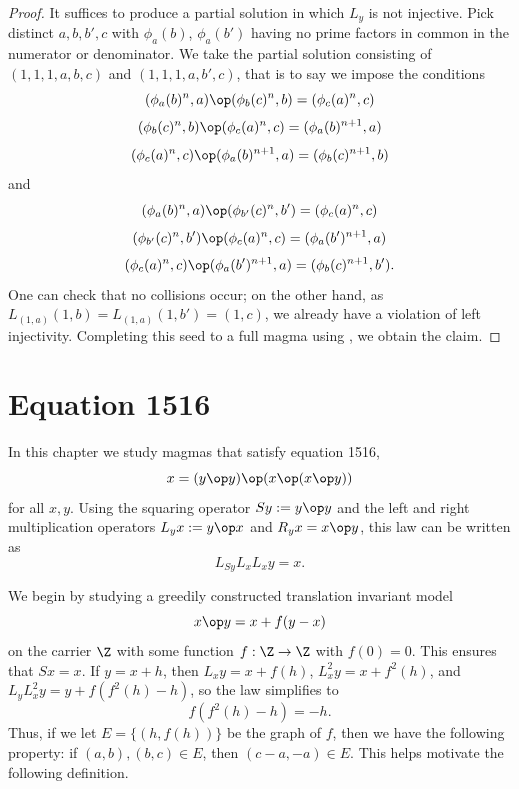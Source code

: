 \begin{proof} It suffices to produce a partial solution in which $L_y$ is not injective. Pick distinct $a, b, b', c$ with $\phi_a(b)$, $\phi_a(b')$ having no prime factors in common in the numerator or denominator.  We take the partial solution consisting of $(1,1,1,a,b,c)$ and $(1,1,1,a,b',c)$, that is to say we impose the conditions
$$ (\phi_a(b)^n,a) \op (\phi_b(c)^n,b) = (\phi_c(a)^n,c)$$
$$ (\phi_b(c)^n,b) \op (\phi_c(a)^n,c) = (\phi_a(b)^{n+1}, a)$$
$$ (\phi_c(a)^n,c) \op (\phi_a(b)^{n+1}, a) = (\phi_b(c)^{n+1},b)$$
and
$$ (\phi_a(b)^n,a) \op (\phi_{b'}(c)^n,b') = (\phi_c(a)^n,c)$$
$$ (\phi_{b'}(c)^n,b') \op (\phi_c(a)^n,c) = (\phi_a(b')^{n+1}, a)$$
$$ (\phi_c(a)^n,c) \op (\phi_{a}(b')^{n+1}, a) = (\phi_b(c)^{n+1},b').$$
One can check that no collisions occur; on the other hand, as $L_{(1,a)} (1,b) = L_{(1,a)} (1,b') = (1,c)$, we already have a violation of left injectivity.  Completing this seed to a full magma using , we obtain the claim.
\end{proof}


\chapter{Equation 1516}\label{1516-chapter}

In this chapter we study magmas that satisfy equation 1516,
\begin{equation}\label{1516}
  x = (y \op y) \op (x \op (x \op y))
\end{equation}
for all $x,y$.  Using the squaring operator $Sy := y \op y$ and the left and right multiplication operators $L_y x := y \op x$ and $R_y x = x \op y$, this law can be written as
$$ L_{Sy} L_x L_x y = x.$$

We begin by studying a greedily constructed translation invariant model
\begin{equation}\label{xy-1516}
   x \op y = x+f(y-x)
\end{equation}
on the carrier $\Z$ with some function $f:\Z \to \Z$ with $f(0)=0$.  This ensures that $Sx = x$.  If $y = x+h$, then $L_x y = x + f(h)$, $L_x^2 y = x + f^2(h)$, and $L_y L_x^2 y = y + f(f^2(h)-h)$, so the law  simplifies to
\begin{equation}\label{1516-f}
   f(f^2(h)-h) = -h.
\end{equation}
Thus, if we let $E = \{ (h, f(h))\}$ be the graph of $f$, then we have the following property: if $(a,b), (b,c) \in E$, then $(c-a,-a) \in E$.  This helps motivate the following definition.

